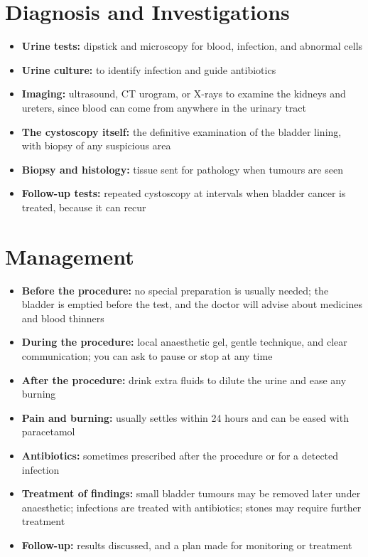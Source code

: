 \section*{Diagnosis and Investigations}
\begin{itemize}
    \item \textbf{Urine tests:} dipstick and microscopy for blood, infection, and abnormal cells
    \item \textbf{Urine culture:} to identify infection and guide antibiotics
    \item \textbf{Imaging:} ultrasound, CT urogram, or X-rays to examine the kidneys and ureters, since blood can come from anywhere in the urinary tract
    \item \textbf{The cystoscopy itself:} the definitive examination of the bladder lining, with biopsy of any suspicious area
    \item \textbf{Biopsy and histology:} tissue sent for pathology when tumours are seen
    \item \textbf{Follow-up tests:} repeated cystoscopy at intervals when bladder cancer is treated, because it can recur
\end{itemize}

\section*{Management}
\begin{itemize}
    \item \textbf{Before the procedure:} no special preparation is usually needed; the bladder is emptied before the test, and the doctor will advise about medicines and blood thinners
    \item \textbf{During the procedure:} local anaesthetic gel, gentle technique, and clear communication; you can ask to pause or stop at any time
    \item \textbf{After the procedure:} drink extra fluids to dilute the urine and ease any burning
    \item \textbf{Pain and burning:} usually settles within 24 hours and can be eased with paracetamol
    \item \textbf{Antibiotics:} sometimes prescribed after the procedure or for a detected infection
    \item \textbf{Treatment of findings:} small bladder tumours may be removed later under anaesthetic; infections are treated with antibiotics; stones may require further treatment
    \item \textbf{Follow-up:} results discussed, and a plan made for monitoring or treatment
\end{itemize}


